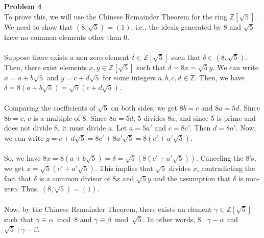 \documentclass{article}
\begin{document}
\noindent \textbf{Problem 4} \\
To prove this, we will use the Chinese Remainder Theorem for the ring $\mathbb{Z}[\sqrt{5}]$. We need to show that $(8, \sqrt{5}) = (1)$, i.e., the ideals generated by $8$ and $\sqrt{5}$ have no common elements other than $0$.\\\\
Suppose there exists a non-zero element $\delta \in \mathbb{Z}[\sqrt{5}]$ such that $\delta \in (8, \sqrt{5})$. Then, there exist elements $x, y \in \mathbb{Z}[\sqrt{5}]$ such that $\delta = 8x = \sqrt{5}y$. We can write $x = a + b\sqrt{5}$ and $y = c + d\sqrt{5}$ for some integers $a, b, c, d \in \mathbb{Z}$. Then, we have $\delta = 8(a + b\sqrt{5}) = \sqrt{5}(c + d\sqrt{5})$.\\\\
Comparing the coefficients of $\sqrt{5}$ on both sides, we get $8b = c$ and $8a = 5d$. Since $8b = c$, $c$ is a multiple of 8. Since $8a = 5d$, 5 divides $8a$, and since 5 is prime and does not divide 8, it must divide $a$. Let $a = 5a'$ and $c = 8c'$. Then $d = 8a'$. Now, we can write $y = c + d\sqrt{5} = 8c' + 8a'\sqrt{5} = 8(c' + a'\sqrt{5})$.\\\\
So, we have $8x = 8(a + b\sqrt{5}) = \delta = \sqrt{5}(8(c' + a'\sqrt{5}))$. Canceling the 8's, we get $x = \sqrt{5}(c' + a'\sqrt{5})$. This implies that $\sqrt{5}$ divides $x$, contradicting the fact that $\delta$ is a common divisor of $8x$ and $\sqrt{5}y$ and the assumption that $\delta$ is non-zero. Thus, $(8, \sqrt{5}) = (1)$.\\\\
Now, by the Chinese Remainder Theorem, there exists an element $\gamma \in \mathbb{Z}[\sqrt{5}]$ such that $\gamma \equiv \alpha \bmod 8$ and $\gamma \equiv \beta \bmod \sqrt{5}$. In other words, $8 \mid \gamma - \alpha$ and $\sqrt{5} \mid \gamma - \beta$.\\\\
\end{document}
